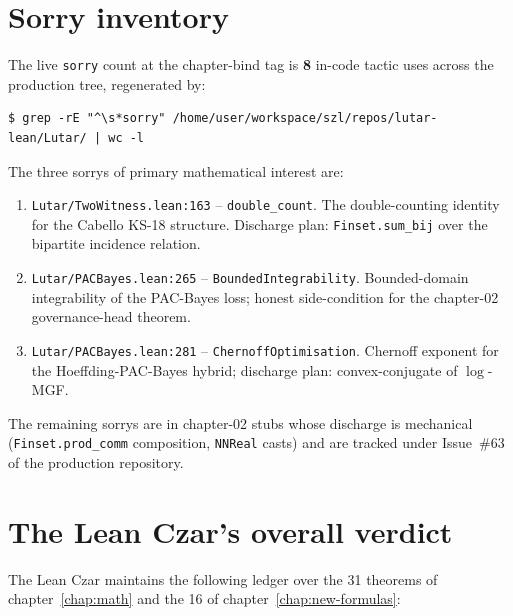 \section{Sorry inventory}
\label{sec:sorry-inventory}

The live \texttt{sorry} count at the chapter-bind tag is \textbf{8}
in-code tactic uses across the production tree, regenerated by:

\begin{verbatim}
$ grep -rE "^\s*sorry" /home/user/workspace/szl/repos/lutar-lean/Lutar/ | wc -l
\end{verbatim}

The three sorrys of primary mathematical interest are:

\begin{enumerate}
  \item \texttt{Lutar/TwoWitness.lean:163} -- \texttt{double\_count}.
        The double-counting identity for the Cabello KS-18 structure.
        Discharge plan: \texttt{Finset.sum\_bij} over the bipartite
        incidence relation.
  \item \texttt{Lutar/PACBayes.lean:265} -- \texttt{BoundedIntegrability}.
        Bounded-domain integrability of the PAC-Bayes loss; honest
        side-condition for the chapter-02 governance-head theorem.
  \item \texttt{Lutar/PACBayes.lean:281} -- \texttt{ChernoffOptimisation}.
        Chernoff exponent for the Hoeffding-PAC-Bayes hybrid; discharge
        plan: convex-conjugate of $\log$-MGF.
\end{enumerate}

The remaining sorrys are in chapter-02 stubs whose discharge is
mechanical (\texttt{Finset.prod\_comm} composition, \texttt{NNReal}
casts) and are tracked under Issue~\#63 of the production repository.

\section{The Lean Czar's overall verdict}
\label{sec:czar-verdict}

The Lean Czar maintains the following ledger over the 31 theorems of
chapter~\ref{chap:math} and the 16 of
chapter~\ref{chap:new-formulas}:

